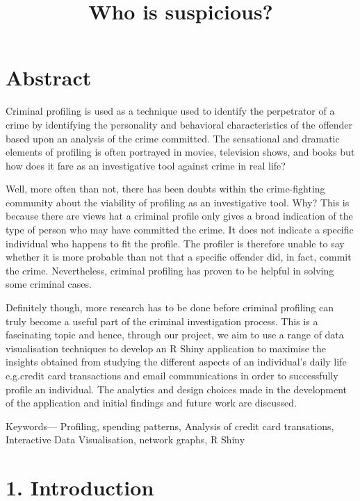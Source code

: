 \documentclass{acm_proc_article-sp}
\title{Who is suspicious?}
\author{
}
\date{}
\begin{document}
\maketitle


\hypertarget{abstract}{%
\section{Abstract}\label{abstract}}

Criminal profiling is used as a technique used to identify the perpetrator of a crime by identifying the personality and behavioral characteristics of the offender based upon an analysis of the crime committed. The sensational and dramatic elements of profiling is often portrayed in movies, television shows, and books but how does it fare as an investigative tool against crime in real life?

Well, more often than not, there has been doubts within the crime-fighting community about the viability of profiling as an investigative tool. Why? This is because there are views hat a criminal profile only gives a broad indication of the type of person who may have committed the crime. It does not indicate a specific individual who happens to fit the profile. The profiler is therefore unable to say whether it is more probable than not that a specific offender did, in fact, commit the crime. Nevertheless, criminal profiling has proven to be helpful in solving some criminal cases.

Definitely though, more research has to be done before criminal profiling can truly become a useful part of the criminal investigation process. This is a fascinating topic and hence, through our project, we aim to use a range of data visualisation techniques to develop an R Shiny application to maximise the insights obtained from studying the different aspects of an individual's daily life e.g.credit card transactions and email communications in order to successfully profile an individual. The analytics and design choices made in the development of the application and initial findings and future work are discussed.

Keywords--- Profiling, spending patterns, Analysis of credit card transations, Interactive Data Visualisation, network graphs, R Shiny

\hypertarget{introduction}{%
\section{1. Introduction}\label{introduction}}
\end{document}
